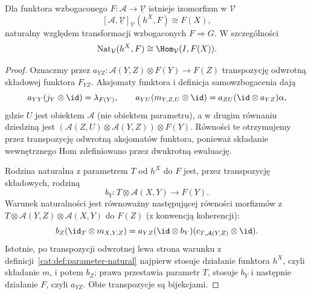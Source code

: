 \begin{twierdzenie}\label{cat:thm:enriched-yoneda}
Dla funktora wzbogaconego $F:\mathcal A\to\underline{\mathcal V}$ istnieje izomorfizm w $\mathcal V$
\[
 [\mathcal A,\underline{\mathcal V}]_{\mathcal V}(h^X,F)\cong F(X),
\]
naturalny względem transformacji wzbogaconych $F\Rightarrow G$. W szczególności
\[
 \operatorname{Nat}_{\mathcal V}(h^X,F)
 \cong\Hom_{\mathcal V}(I,F(X)).
\]
\end{twierdzenie}
\begin{proof}
Oznaczmy przez $a_{YZ}:\mathcal A(Y,Z)\otimes F(Y)\to F(Z)$ transpozycję odwrotną składowej funktora $F_{YZ}$. Aksjomaty funktora i definicja samowzbogacenia dają
\[
 a_{YY}(j_Y\otimes\id)=\lambda_{F(Y)},\qquad
 a_{YU}(m_{Y,Z,U}\otimes\id)
 =a_{ZU}(\id\otimes a_{YZ})\alpha,
\]
gdzie $U$ jest obiektem $\mathcal A$ (nie obiektem parametru), a w drugim równaniu dziedziną jest
$(\mathcal A(Z,U)\otimes\mathcal A(Y,Z))\otimes F(Y)$.
Równości te otrzymujemy przez transpozycję odwrotną aksjomatów funktora, ponieważ składanie wewnętrznego Hom zdefiniowano przez dwukrotną ewaluację.

Rodzina naturalna z parametrem $T$ od $h^X$ do $F$ jest, przez transpozycję składowych, rodziną
\[
 b_Y:T\otimes\mathcal A(X,Y)\to F(Y).
\]
Warunek naturalności jest równoważny następującej równości morfizmów z $T\otimes\mathcal A(Y,Z)\otimes\mathcal A(X,Y)$ do $F(Z)$ (z konwencją koherencji):
\begin{equation}\label{cat:eq:enriched-yoneda-naturality}
 b_Z(\id_T\otimes m_{X,Y,Z})
 =a_{YZ}(\id\otimes b_Y)(c_{T,\mathcal A(Y,Z)}\otimes\id).
\end{equation}
Istotnie, po transpozycji odwrotnej lewa strona warunku z definicji~\ref{cat:def:parameter-natural} najpierw stosuje działanie funktora $h^X$, czyli składanie $m$, i potem $b_Z$; prawa przestawia parametr $T$, stosuje $b_Y$ i następnie działanie $F$, czyli $a_{YZ}$. Obie transpozycje są bijekcjami.


\end{proof}
